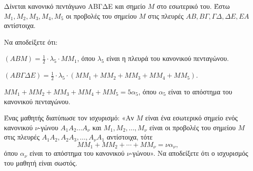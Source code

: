 Δίνεται κανονικό πεντάγωνο ΑΒΓΔΕ και σημείο $M$ στο εσωτερικό του. Έστω $M_1, M_2, M_3, M_4, M_5$ οι προβολές του σημείου $M$ στις πλευρές $AB, B\Gamma, \Gamma\Delta, \Delta E, EA$ αντίστοιχα.
\begin{alist}
    \item Να αποδείξετε ότι:
    \begin{rlist}
        \item $(ABM) = \frac{1}{2} \cdot \lambda_5 \cdot MM_1$, όπου $\lambda_5$ είναι η πλευρά του κανονικού πενταγώνου. 
        \item $(ΑΒΓΔΕ) = \frac{1}{2} \cdot \lambda_5 \cdot (MM_1 + MM_2 + MM_3 + MM_4 + MM_5)$. 
        \item $MM_1 + MM_2 + MM_3 + MM_4 + MM_5 = 5\alpha_5$, όπου $\alpha_5$ είναι το απόστημα του κανονικού πενταγώνου. 
    \end{rlist}
    \item Ένας μαθητής διατύπωσε τον ισχυρισμό: «Αν $M$ είναι ένα εσωτερικό σημείο ενός κανονικού $\nu$-γώνου $A_1A_2...A_\nu$ και $M_1, M_2,..., M_\nu$ είναι οι προβολές του σημείου $M$ στις πλευρές $A_1A_2, A_2A_3,...,A_\nu A_1$ αντίστοιχα, τότε
    \[ MM_1 + MM_2 + \cdots + MM_\nu = \nu\alpha_\nu, \]
    όπου $\alpha_\nu$ είναι το απόστημα του κανονικού $\nu$-γώνου». Να αποδείξετε ότι ο ισχυρισμός του μαθητή είναι σωστός. 
\end{alist}